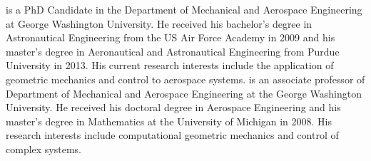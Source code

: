 \documentclass[10pt,fleqn]{IJCAS}  %
\begin{document}
\begin{multicols}{2}


    {is a PhD Candidate in the Department of Mechanical and Aerospace Engineering at George Washington University. 
    He received his bachelor's degree in Astronautical Engineering from the US Air Force Academy in 2009 and his master's degree in Aeronautical and Astronautical Engineering from Purdue University in 2013.
    His current research interests include the application of geometric mechanics and control to aerospace systems. 
    }
    {is an associate professor of Department of Mechanical and Aerospace Engineering at the George Washington University. 
    He received his doctoral degree in Aerospace Engineering and his master's degree in Mathematics at the University of Michigan in 2008. 
    His research interests include computational geometric mechanics and control of complex systems.}    
\clearafterbiography\relax
\clearafterbiography\relax

\end{multicols}
\end{document}
